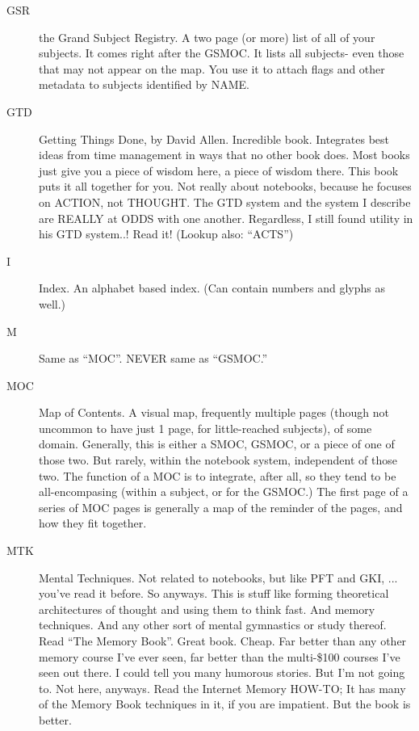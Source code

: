 \documentclass[oneside]{scrbook}
\begin{document}
\begin{description}
\item[GSR] the Grand Subject Registry. A two page (or more) list of all of
your subjects. It comes right after the GSMOC. It lists all subjects-
even those that may not appear on the map. You use it to attach flags
and other metadata to subjects identified by NAME.

\item[GTD] Getting Things Done, by David Allen. Incredible book. Integrates
best ideas from time management in ways that no other book does. Most
books just give you a piece of wisdom here, a piece of wisdom
there. This book puts it all together for you. Not really about
notebooks, because he focuses on ACTION, not THOUGHT. The GTD system
and the system I describe are REALLY at ODDS with one
another. Regardless, I still found utility in his GTD system..! Read
it! (Lookup also: ``ACTS'')

\item[I] Index. An alphabet based index. (Can contain numbers and glyphs as
well.)

\item[M] Same as ``MOC''. NEVER same as ``GSMOC.''

\item[MOC] Map of Contents. A visual map, frequently multiple pages (though
not uncommon to have just 1 page, for little-reached subjects), of
some domain. Generally, this is either a SMOC, GSMOC, or a piece of
one of those two. But rarely, within the notebook system, independent
of those two. The function of a MOC is to integrate, after all, so
they tend to be all-encompasing (within a subject, or for the GSMOC.)
The first page of a series of MOC pages is generally a map of the
reminder of the pages, and how they fit together.

\item[MTK] Mental Techniques. Not related to notebooks, but like PFT and
GKI, ... you've read it before. So anyways. This is stuff like forming
theoretical architectures of thought and using them to think fast. And
memory techniques. And any other sort of mental gymnastics or study
thereof. Read ``The Memory Book''. Great book. Cheap. Far better than
any other memory course I've ever seen, far better than the multi-\$100
courses I've seen out there. I could tell you many humorous
stories. But I'm not going to. Not here, anyways.  Read the
Internet Memory HOW-TO; It has many of the Memory Book techniques in
it, if you are impatient. But the book is better.


\end{description}
\end{document}
